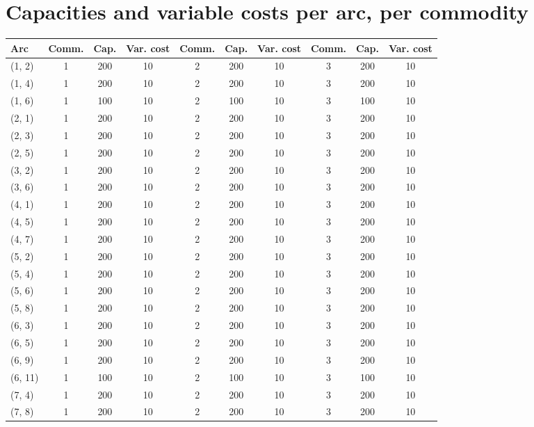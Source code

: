 \documentclass{article}
\begin{document}
\section{Capacities and variable costs per arc, per commodity}
\small
\begin{longtable}{||l||c|c|c||c|c|c||c|c|c||}
\hline
{Arc} & {Comm.} & {Cap.} & {Var. cost} & {Comm.} & {Cap.} & {Var. cost} & {Comm.} & {Cap.} & {Var. cost}\\
\hline
\endhead
(1, 2) & 1 & 200 & 10 & 2 & 200 & 10 & 3 & 200 & 10 \\
\hline
(1, 4) & 1 & 200 & 10 & 2 & 200 & 10 & 3 & 200 & 10 \\
\hline
(1, 6) & 1 & 100 & 10 & 2 & 100 & 10 & 3 & 100 & 10 \\
\hline
(2, 1) & 1 & 200 & 10 & 2 & 200 & 10 & 3 & 200 & 10 \\
\hline
(2, 3) & 1 & 200 & 10 & 2 & 200 & 10 & 3 & 200 & 10 \\
\hline
(2, 5) & 1 & 200 & 10 & 2 & 200 & 10 & 3 & 200 & 10 \\
\hline
(3, 2) & 1 & 200 & 10 & 2 & 200 & 10 & 3 & 200 & 10 \\
\hline
(3, 6) & 1 & 200 & 10 & 2 & 200 & 10 & 3 & 200 & 10 \\
\hline
(4, 1) & 1 & 200 & 10 & 2 & 200 & 10 & 3 & 200 & 10 \\
\hline
(4, 5) & 1 & 200 & 10 & 2 & 200 & 10 & 3 & 200 & 10 \\
\hline
(4, 7) & 1 & 200 & 10 & 2 & 200 & 10 & 3 & 200 & 10 \\
\hline
(5, 2) & 1 & 200 & 10 & 2 & 200 & 10 & 3 & 200 & 10 \\
\hline
(5, 4) & 1 & 200 & 10 & 2 & 200 & 10 & 3 & 200 & 10 \\
\hline
(5, 6) & 1 & 200 & 10 & 2 & 200 & 10 & 3 & 200 & 10 \\
\hline
(5, 8) & 1 & 200 & 10 & 2 & 200 & 10 & 3 & 200 & 10 \\
\hline
(6, 3) & 1 & 200 & 10 & 2 & 200 & 10 & 3 & 200 & 10 \\
\hline
(6, 5) & 1 & 200 & 10 & 2 & 200 & 10 & 3 & 200 & 10 \\
\hline
(6, 9) & 1 & 200 & 10 & 2 & 200 & 10 & 3 & 200 & 10 \\
\hline
(6, 11) & 1 & 100 & 10 & 2 & 100 & 10 & 3 & 100 & 10 \\
\hline
(7, 4) & 1 & 200 & 10 & 2 & 200 & 10 & 3 & 200 & 10 \\
\hline
(7, 8) & 1 & 200 & 10 & 2 & 200 & 10 & 3 & 200 & 10 \\

\end{longtable}
\end{document}
